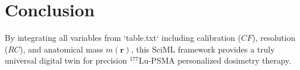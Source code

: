 \documentclass[11pt,a4paper]{article}
\begin{document}
\section{Conclusion}
By integrating all variables from `table.txt` including calibration ($CF$), resolution ($RC$), and anatomical mass $m(\mathbf{r})$, this SciML \cite{Rackauckas_2020} framework provides a truly universal digital twin for precision $^{177}$Lu-PSMA personalized dosimetry \cite{Garin2020} therapy.



\end{document}
